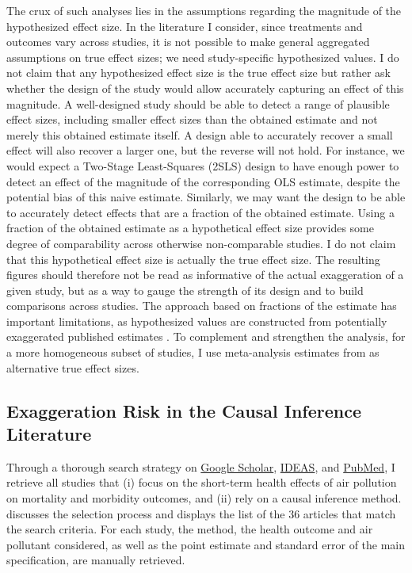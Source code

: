 \documentclass[12pt]{article}
\begin{document}
		The crux of such analyses lies in the assumptions regarding the magnitude of the hypothesized effect size. In the literature I consider, since treatments and outcomes vary across studies, it is not possible to make general aggregated assumptions on true effect sizes; we need study-specific hypothesized values. I do not claim that any hypothesized effect size is the true effect size but rather ask whether the design of the study would allow accurately capturing an effect of this magnitude. A well-designed study should be able to detect a range of plausible effect sizes, including smaller effect sizes than the obtained estimate and not merely this obtained estimate itself. A design able to accurately recover a small effect will also recover a larger one, but the reverse will not hold. For instance, we would expect a Two-Stage Least-Squares (2SLS) design to have enough power to detect an effect of the magnitude of the corresponding OLS estimate, despite the potential bias of this naive estimate. Similarly, we may want the design to be able to accurately detect effects that are a fraction of the obtained estimate. Using a fraction of the obtained estimate as a hypothetical effect size provides some degree of comparability across otherwise non-comparable studies. I do not claim that this hypothetical effect size is actually the true effect size. The resulting figures should therefore not be read as informative of the actual exaggeration of a given study, but as a way to gauge the strength of its design and to build comparisons across studies. The approach based on fractions of the estimate has important limitations, as hypothesized values are constructed from potentially exaggerated published estimates \citep{gelman_beyond_2014}. To complement and strengthen the analysis, for a more homogeneous subset of studies, I use meta-analysis estimates from \cite{shah_short_2015} as alternative true effect sizes. 
		
	\subsection{Exaggeration Risk in the Causal Inference Literature}
        
		Through a thorough search strategy on \href{https://scholar.google.com/}{Google Scholar}, \href{https://ideas.repec.org/}{IDEAS}, and \href{https://pubmed.ncbi.nlm.nih.gov/}{PubMed}, I retrieve all studies that (i) focus on the short-term health effects of air pollution on mortality and morbidity outcomes, and (ii) rely on a causal inference method.  discusses the selection process and displays the list of the 36 articles that match the search criteria. For each study, the method, the health outcome and air pollutant considered, as well as the point estimate and standard error of the main specification, are manually retrieved.%
        
\end{document}
